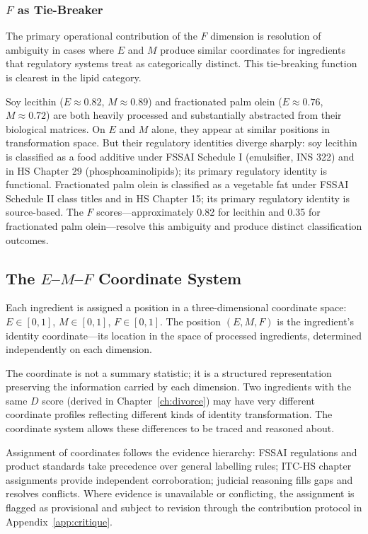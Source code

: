 \documentclass[12pt,a3paper]{article}
\begin{document}
\subsubsection{$F$ as Tie-Breaker}

The primary operational contribution of the $F$ dimension is resolution of ambiguity in cases where $E$ and $M$ produce similar coordinates for ingredients that regulatory systems treat as categorically distinct. This tie-breaking function is clearest in the lipid category.

Soy lecithin ($E \approx 0.82$, $M \approx 0.89$) and fractionated palm olein ($E \approx 0.76$, $M \approx 0.72$) are both heavily processed and substantially abstracted from their biological matrices. On $E$ and $M$ alone, they appear at similar positions in transformation space. But their regulatory identities diverge sharply: soy lecithin is classified as a food additive under FSSAI Schedule I (emulsifier, INS 322) and in HS Chapter 29 (phosphoaminolipids); its primary regulatory identity is functional. Fractionated palm olein is classified as a vegetable fat under FSSAI Schedule II class titles and in HS Chapter 15; its primary regulatory identity is source-based. The $F$ scores---approximately 0.82 for lecithin and 0.35 for fractionated palm olein---resolve this ambiguity and produce distinct classification outcomes.

\subsection{The $E$--$M$--$F$ Coordinate System}

Each ingredient is assigned a position in a three-dimensional coordinate space: $E \in [0, 1]$, $M \in [0, 1]$, $F \in [0, 1]$. The position $(E, M, F)$ is the ingredient's identity coordinate---its location in the space of processed ingredients, determined independently on each dimension.

The coordinate is not a summary statistic; it is a structured representation preserving the information carried by each dimension. Two ingredients with the same $D$ score (derived in Chapter~\ref{ch:divorce}) may have very different coordinate profiles reflecting different kinds of identity transformation. The coordinate system allows these differences to be traced and reasoned about.

Assignment of coordinates follows the evidence hierarchy: FSSAI regulations and product standards take precedence over general labelling rules; ITC-HS chapter assignments provide independent corroboration; judicial reasoning fills gaps and resolves conflicts. Where evidence is unavailable or conflicting, the assignment is flagged as provisional and subject to revision through the contribution protocol in Appendix~\ref{app:critique}.
\end{document}
